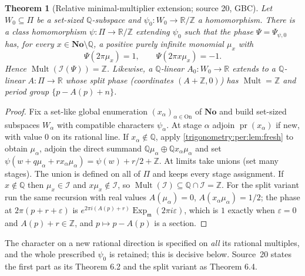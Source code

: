 \documentclass[11pt,letterpaper]{article}
\numberwithin{equation}{section}
\newtheorem{theorem}{Theorem}[section]
\theoremstyle{definition}
\theoremstyle{remark}
\newcommand{\No}{\mathbf{No}}
\newcommand{\R}{\mathbb R}
\newcommand{\Q}{\mathbb Q}
\newcommand{\Z}{\mathbb Z}
\newcommand{\mm}{\mathfrak m}
\newcommand{\eps}{\varepsilon}
\newcommand{\Ex}{\operatorname{Exp}_{\mm}}
\newcommand{\Mult}{\operatorname{Mult}}
\newcommand{\pr}{\operatorname{pr}}
\newcommand{\cI}{\mathcal I}
\begin{document}
\begin{theorem}[Relative minimal-multiplier extension; source 20, GBC]\label{trigonometry:per:thm:relative}
Let $W_0\subseteq\Pi$ be a set-sized $\Q$-subspace and $\psi_0:W_0\to\R/\Z$ a homomorphism. There is a
class homomorphism $\psi:\Pi\to\R/\Z$ extending $\psi_0$ such that the phase $\Psi=\Psi_{\psi,0}$ has,
for every $x\in\No\setminus\Q$, a positive purely infinite monomial $\mu_x$ with
\[
 \Psi(2\pi\mu_x)=1,\qquad \Psi(2\pi x\mu_x)=-1 .
\]
Hence $\Mult(\cI(\Psi))=\Z$. Likewise, a $\Q$-linear $A_0:W_0\to\R$ extends to a $\Q$-linear
$A:\Pi\to\R$ whose split phase (coordinates $(A+\Z,0)$) has $\Mult=\Z$ and period group
$\{p-A(p)+n\}$.
\end{theorem}
\begin{proof}
Fix a set-like global enumeration $(x_\alpha)_{\alpha\in\mathrm{On}}$ of $\No$ and build set-sized
subspaces $W_\alpha$ with compatible characters $\psi_\alpha$. At stage $\alpha$ adjoin
$\pr(x_\alpha)$ if new, with value $0$ on its rational line. If $x_\alpha\notin\Q$, apply
\cref{trigonometry:per:lem:fresh} to obtain $\mu_\alpha$, adjoin the direct summand
$\Q\mu_\alpha\oplus\Q x_\alpha\mu_\alpha$ and set
$\psi(w+q\mu_\alpha+rx_\alpha\mu_\alpha)=\psi(w)+r/2+\Z$. At limits take unions (set many stages). The
union is defined on all of $\Pi$ and keeps every stage assignment. If $x\notin\Q$ then $\mu_x\in\cI$
and $x\mu_x\notin\cI$, so $\Mult(\cI)\subseteq\Q\cap\cI=\Z$. For the split variant run the same
recursion with real values $A(\mu_\alpha)=0$, $A(x_\alpha\mu_\alpha)=1/2$; the phase at $2\pi(p+r+\eps)$
is $e^{2\pi i(A(p)+r)}\Ex(2\pi i\eps)$, which is $1$ exactly when $\eps=0$ and $A(p)+r\in\Z$, and
$p\mapsto p-A(p)$ is a section.
\end{proof}
The character on a new rational direction is specified on \emph{all} its rational multiples, and the
whole prescribed $\psi_0$ is retained; this is decisive below. Source~20 states the first part as its
Theorem 6.2 and the split variant as Theorem 6.4.
\end{document}
